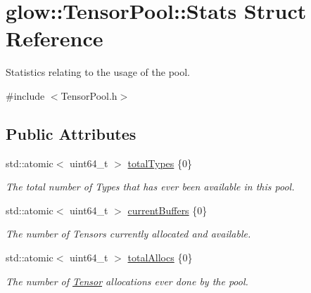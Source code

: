 \hypertarget{structglow_1_1_tensor_pool_1_1_stats}{}\section{glow\+:\+:Tensor\+Pool\+:\+:Stats Struct Reference}
\label{structglow_1_1_tensor_pool_1_1_stats}


Statistics relating to the usage of the pool.  




{\ttfamily \#include $<$Tensor\+Pool.\+h$>$}

\subsection*{Public Attributes}
\begin{DoxyCompactItemize}
\item 
\mbox{\label{structglow_1_1_tensor_pool_1_1_stats_addabd15f18e11bafde03349aabba227f}} 
std\+::atomic$<$ uint64\+\_\+t $>$ \hyperlink{structglow_1_1_tensor_pool_1_1_stats_addabd15f18e11bafde03349aabba227f}{total\+Types} \{0\}
\begin{DoxyCompactList}\small\item\em The total number of Types that has ever been available in this pool. \end{DoxyCompactList}\item 
\mbox{\label{structglow_1_1_tensor_pool_1_1_stats_af956c077dae2fb2a2188bf2edbdab570}} 
std\+::atomic$<$ uint64\+\_\+t $>$ \hyperlink{structglow_1_1_tensor_pool_1_1_stats_af956c077dae2fb2a2188bf2edbdab570}{current\+Buffers} \{0\}
\begin{DoxyCompactList}\small\item\em The number of Tensors currently allocated and available. \end{DoxyCompactList}\item 
\mbox{\label{structglow_1_1_tensor_pool_1_1_stats_ac41a1336dd8a5756d6a6581d5e664544}} 
std\+::atomic$<$ uint64\+\_\+t $>$ \hyperlink{structglow_1_1_tensor_pool_1_1_stats_ac41a1336dd8a5756d6a6581d5e664544}{total\+Allocs} \{0\}
\begin{DoxyCompactList}\small\item\em The number of \hyperlink{classglow_1_1_tensor}{Tensor} allocations ever done by the pool. \end{DoxyCompactList}\item 

\end{DoxyCompactItemize}
